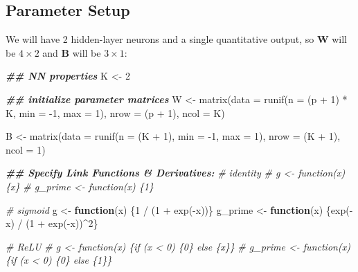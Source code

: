 \documentclass[
]{book}
\newenvironment{Shaded}{\begin{snugshade}}{\end{snugshade}}
\newcommand{\AttributeTok}[1]{\textcolor[rgb]{0.77,0.63,0.00}{#1}}
\newcommand{\CommentTok}[1]{\textcolor[rgb]{0.56,0.35,0.01}{\textit{#1}}}
\newcommand{\ControlFlowTok}[1]{\textcolor[rgb]{0.13,0.29,0.53}{\textbf{#1}}}
\newcommand{\DecValTok}[1]{\textcolor[rgb]{0.00,0.00,0.81}{#1}}
\newcommand{\DocumentationTok}[1]{\textcolor[rgb]{0.56,0.35,0.01}{\textbf{\textit{#1}}}}
\newcommand{\FunctionTok}[1]{\textcolor[rgb]{0.00,0.00,0.00}{#1}}
\newcommand{\NormalTok}[1]{#1}
\newcommand{\OtherTok}[1]{\textcolor[rgb]{0.56,0.35,0.01}{#1}}
\newcommand{\SpecialCharTok}[1]{\textcolor[rgb]{0.00,0.00,0.00}{#1}}
\begin{document}
\hypertarget{parameter-setup}{%
\subsection{Parameter Setup}\label{parameter-setup}}

We will have 2 hidden-layer neurons and a single quantitative output, so \textbf{W} will be \(4 \times 2\) and \textbf{B} will be \(3 \times 1\):

\begin{Shaded}
\begin{Highlighting}[]
\DocumentationTok{\#\# NN properties}
\NormalTok{K }\OtherTok{\textless{}{-}} \DecValTok{2}

\DocumentationTok{\#\# initialize parameter matrices}
\NormalTok{W }\OtherTok{\textless{}{-}} \FunctionTok{matrix}\NormalTok{(}\AttributeTok{data =} \FunctionTok{runif}\NormalTok{(}\AttributeTok{n =}\NormalTok{ (p }\SpecialCharTok{+} \DecValTok{1}\NormalTok{) }\SpecialCharTok{*}\NormalTok{ K, }\AttributeTok{min =} \SpecialCharTok{{-}}\DecValTok{1}\NormalTok{, }\AttributeTok{max =} \DecValTok{1}\NormalTok{),}
            \AttributeTok{nrow =}\NormalTok{ (p }\SpecialCharTok{+} \DecValTok{1}\NormalTok{),}
            \AttributeTok{ncol =}\NormalTok{ K)}

\NormalTok{B }\OtherTok{\textless{}{-}} \FunctionTok{matrix}\NormalTok{(}\AttributeTok{data =} \FunctionTok{runif}\NormalTok{(}\AttributeTok{n =}\NormalTok{ (K }\SpecialCharTok{+} \DecValTok{1}\NormalTok{), }\AttributeTok{min =} \SpecialCharTok{{-}}\DecValTok{1}\NormalTok{, }\AttributeTok{max =} \DecValTok{1}\NormalTok{),}
            \AttributeTok{nrow =}\NormalTok{ (K }\SpecialCharTok{+} \DecValTok{1}\NormalTok{),}
            \AttributeTok{ncol =} \DecValTok{1}\NormalTok{)}

\DocumentationTok{\#\# Specify Link Functions \& Derivatives:}
\CommentTok{\# identity}
\CommentTok{\# g \textless{}{-} function(x) \{x\}}
\CommentTok{\# g\_prime \textless{}{-} function(x) \{1\}}

\CommentTok{\# sigmoid}
\NormalTok{g }\OtherTok{\textless{}{-}} \ControlFlowTok{function}\NormalTok{(x) \{}\DecValTok{1} \SpecialCharTok{/}\NormalTok{ (}\DecValTok{1} \SpecialCharTok{+} \FunctionTok{exp}\NormalTok{(}\SpecialCharTok{{-}}\NormalTok{x))\}}
\NormalTok{g\_prime }\OtherTok{\textless{}{-}} \ControlFlowTok{function}\NormalTok{(x) \{}\FunctionTok{exp}\NormalTok{(}\SpecialCharTok{{-}}\NormalTok{x) }\SpecialCharTok{/}\NormalTok{ (}\DecValTok{1} \SpecialCharTok{+} \FunctionTok{exp}\NormalTok{(}\SpecialCharTok{{-}}\NormalTok{x))}\SpecialCharTok{\^{}}\DecValTok{2}\NormalTok{\}}

\CommentTok{\# ReLU}
\CommentTok{\# g \textless{}{-} function(x) \{if (x \textless{} 0) \{0\} else \{x\}\}}
\CommentTok{\# g\_prime \textless{}{-} function(x) \{if (x \textless{} 0) \{0\} else \{1\}\}}
\end{Highlighting}
\end{Shaded}
\end{document}
